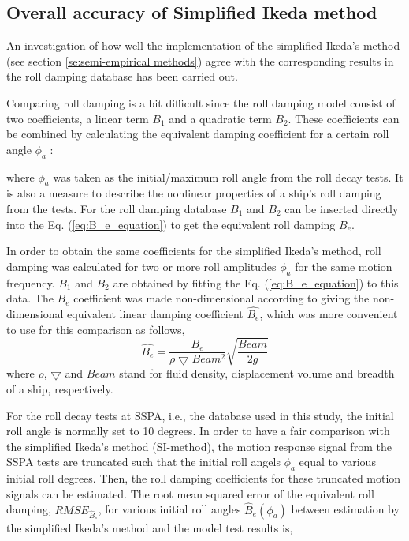 \subsection{Overall accuracy of Simplified Ikeda method}
\label{se:overall_comparison}
An investigation of how well the implementation of the simplified Ikeda's method (see section \ref{se:semi-empirical methods}) agree with the corresponding results in the roll damping database has been carried out. 

Comparing roll damping is a bit difficult since the roll damping model consist of two coefficients, a linear term $B_1$ and a quadratic term $B_2$. These coefficients can be combined by calculating the equivalent damping coefficient for a certain roll angle $\phi_a$ \parencite{himeno_prediction_1981}:


where $\phi_a$ was taken as the initial/maximum roll angle from the roll decay tests. It is also a measure to describe the nonlinear properties of a ship's roll damping from the tests. For the roll damping database $B_1$ and $B_2$ can be inserted directly into the Eq. (\ref{eq:B_e_equation}) to get the equivalent roll damping $B_e$.

In order to obtain the same coefficients for the simplified Ikeda's method, roll damping was calculated for two or more roll amplitudes $\phi_a$ for the same motion frequency. $B_1$ and $B_2$ are obtained by fitting the Eq. (\ref{eq:B_e_equation}) to this data. The $B_e$ coefficient was made non-dimensional according to \parencite{himeno_prediction_1981}  giving the non-dimensional equivalent linear damping coefficient $\hat{B_e}$, which was more convenient to use for this comparison as follows,
\begin{equation} \label{eq:be_eqvalent}
    \hat{B_e} = \frac{B_e}{\rho \bigtriangledown Beam^2} \sqrt{\frac{Beam}{2g}}
\end{equation}
where $\rho$, $\bigtriangledown$ and $Beam$ stand for fluid density, displacement volume and breadth of a ship, respectively.


For the roll decay tests at SSPA, i.e., the database used in this study, the initial roll angle is normally set to 10 degrees. In order to have a fair comparison with the simplified Ikeda's method (SI-method), the motion response signal from the SSPA tests are truncated such that the initial roll angels $\phi_a$ equal to various initial roll degrees. Then, the roll damping coefficients for these truncated motion signals can be estimated. The root mean squared error of the equivalent roll damping, $RMSE_{\hat{B}_e}$, for various initial roll angles $\hat{B}_e(\phi_a)$ between estimation by the simplified Ikeda's method and the model test results is,

